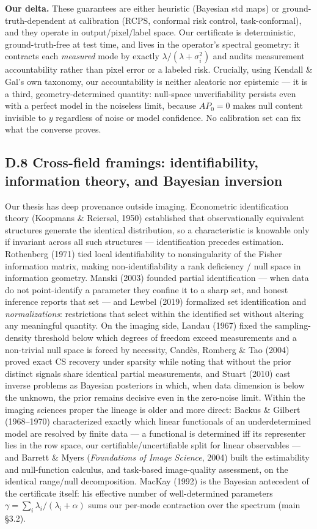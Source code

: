 \documentclass[11pt]{article}
\begin{document}
\textbf{Our delta.} These guarantees are either heuristic (Bayesian std maps) or ground-truth-dependent at calibration (RCPS, conformal risk control, task-conformal), and they operate in output/pixel/label space. Our certificate is deterministic, ground-truth-free at test time, and lives in the operator's spectral geometry: it contracts each \textit{measured} mode by exactly $\lambda/(\lambda+\sigma_i^2)$ and audits measurement accountability rather than pixel error or a labeled risk. Crucially, using Kendall \& Gal's own taxonomy, our accountability is neither aleatoric nor epistemic --- it is a third, geometry-determined quantity: null-space unverifiability persists even with a perfect model in the noiseless limit, because $A P_0 = 0$ makes null content invisible to $y$ regardless of noise or model confidence. No calibration set can fix what the converse proves.

\subsection*{D.8 Cross-field framings: identifiability, information theory, and Bayesian inversion}

Our thesis has deep provenance outside imaging. Econometric identification theory (Koopmans \& Reiersøl, 1950) established that observationally equivalent structures generate the identical distribution, so a characteristic is knowable only if invariant across all such structures --- identification precedes estimation. Rothenberg (1971) tied local identifiability to nonsingularity of the Fisher information matrix, making non-identifiability a rank deficiency / null space in information geometry. Manski (2003) founded partial identification --- when data do not point-identify a parameter they confine it to a sharp set, and honest inference reports that set --- and Lewbel (2019) formalized set identification and \textit{normalizations}: restrictions that select within the identified set without altering any meaningful quantity. On the imaging side, Landau (1967) fixed the sampling-density threshold below which degrees of freedom exceed measurements and a non-trivial null space is forced by necessity, Candès, Romberg \& Tao (2004) proved exact CS recovery under sparsity while noting that without the prior distinct signals share identical partial measurements, and Stuart (2010) cast inverse problems as Bayesian posteriors in which, when data dimension is below the unknown, the prior remains decisive even in the zero-noise limit. Within the imaging sciences proper the lineage is older and more direct: Backus \& Gilbert (1968--1970) characterized exactly which linear functionals of an underdetermined model are resolved by finite data --- a functional is determined iff its representer lies in the row space, our certifiable/uncertifiable split for linear observables --- and Barrett \& Myers (\textit{Foundations of Image Science}, 2004) built the estimability and null-function calculus, and task-based image-quality assessment, on the identical range/null decomposition. MacKay (1992) is the Bayesian antecedent of the certificate itself: his effective number of well-determined parameters $\gamma = \sum_i \lambda_i/(\lambda_i+\alpha)$ sums our per-mode contraction over the spectrum (main §3.2).
\end{document}

